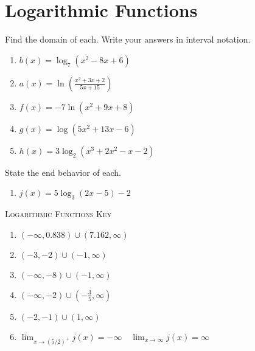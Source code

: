 \chapter{Logarithmic Functions}

Find the domain of each. Write your answers in interval notation.
\begin{enumerate}
	\item $b(x) = \log_7\left(x^2 - 8x + 6\right)$
	\item $a(x) = \ln\left(\frac{x^2+3x+2}{5x+15}\right)$
	\item $f(x) = -7\ln\left(x^2 + 9x + 8\right)$
	\item $g(x) = \log\left(5x^2 + 13x - 6\right)$
	\item $h(x) = 3\log_2\left(x^3+2x^2-x-2\right)$
\end{enumerate}
\setcounter{Review}{\value{enumi}}

State the end behavior of each.
\begin{enumerate}	\setcounter{enumi}{\value{Review}}
	\item $j(x) = 5\log_3\left(2x-5\right) - 2$
\end{enumerate}

\newpage

\textsc{Logarithmic Functions Key}

\begin{enumerate}
	\item $(-\infty, 0.838) \cup (7.162, \infty)$
    \item $(-3, -2) \cup (-1, \infty)$
    \item $(-\infty, -8) \cup (-1, \infty)$
    \item $(-\infty, -2) \cup \left(-\frac{3}{5}, \infty\right)$
    \item $(-2, -1) \cup (1, \infty)$
    \item $\lim_{x \to (5/2)^+} j(x) = -\infty \quad \lim_{x \to \infty} j(x) = \infty$ 
\end{enumerate}
